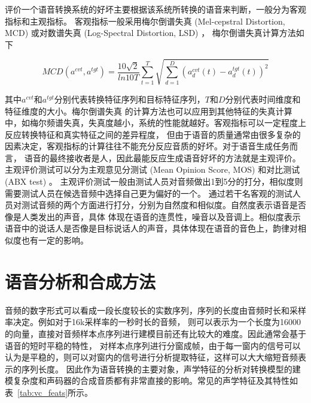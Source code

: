 评价一个语音转换系统的好坏主要根据该系统所转换的语音来判断，一般分为客观指标和主观指标。
客观指标一般采用梅尔倒谱失真 (Mel-cepstral Distortion, MCD) 或对数谱失真 (Log-Spectral Distortion, LSD) ，
梅尔倒谱失真计算方法如下

$$MCD(a^{cvt}, a^{tgt})=\frac{10\sqrt{2}}{ln10T}\sum^{T}_{t=1}\sqrt{\sum^{D}_{d=1}(a^{cvt}_{d}(t)-a^{tgt}_{d}(t))^2}$$

其中$a^{cvt}$和$a^{tgt}$分别代表转换特征序列和目标特征序列，$T$和$D$分别代表时间维度和特征维度的大小。梅尔倒谱失真
的计算方法也可以应用到其他特征的失真计算中，如梅尔频谱失真，失真度越小，系统的性能就越好。客观指标可以一定程度上反应转换特征和真实特征之间的差异程度，
但由于语音的质量通常由很多复杂的因素决定，客观指标的计算往往不能充分反应音质的好坏。对于语音生成任务而言，
语音的最终接收者是人，因此最能反应生成语音好坏的方法就是主观评价。主观评价测试可以分为主观意见分测试 (Mean Opinion Score, MOS) 和对比测试 (ABX test) 。
主观评价测试一般由测试人员对音频做出1到5分的打分，相似度则需要测试人员在候选音频中选择自己更为偏好的一个。
通过若干名客观的测试人员对测试音频的两个方面进行打分，分别为自然度和相似度。自然度表示语音是否像是人类发出的声音，具体
体现在语音的连贯性，噪音以及音调上。相似度表示语音中的说话人是否像是目标说话人的声音，具体体现在语音的音色上，韵律对相似度也有一定的影响。


\section{语音分析和合成方法}
音频的数字形式可以看成一段长度较长的实数序列，序列的长度由音频时长和采样率决定。例如对于16k采样率的一秒时长的音频，
则可以表示为一个长度为16000的向量，直接对音频样本点序列进行建模目前还有比较大的难度。因此通常会基于语音的短时平稳的特性，
对样本点序列进行分窗成帧，由于每一窗内的信号可以认为是平稳的，则可以对窗内的信号进行分析提取特征，这样可以大大缩短音频表示的序列长度。
因此作为语音转换的主要对象，声学特征的分析对转换模型的建模复杂度和声码器的合成音质都有非常直接的影响。常见的声学特征及其特性如表~\ref{tab:vc_feats}所示\cite{Nurminen2012Voice}。


